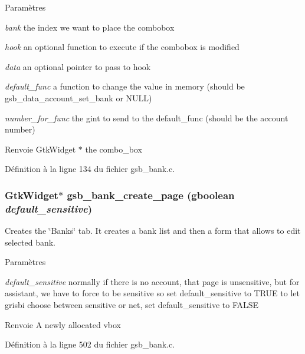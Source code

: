 \begin{DoxyParams}{Paramètres}
\item[{\em bank}]the index we want to place the combobox \item[{\em hook}]an optional function to execute if the combobox is modified \item[{\em data}]an optional pointer to pass to hook \item[{\em default\_\-func}]a function to change the value in memory (should be gsb\_\-data\_\-account\_\-set\_\-bank or NULL) \item[{\em number\_\-for\_\-func}]the gint to send to the default\_\-func (should be the account number)\end{DoxyParams}
\begin{DoxyReturn}{Renvoie}
GtkWidget $\ast$ the combo\_\-box 
\end{DoxyReturn}


Définition à la ligne 134 du fichier gsb\_\-bank.c.

\subsubsection[{gsb\_\-bank\_\-create\_\-page}]{\setlength{\rightskip}{0pt plus 5cm}GtkWidget$\ast$ gsb\_\-bank\_\-create\_\-page (gboolean {\em default\_\-sensitive})}\label{gsb__bank_8h_aef019dce3bfc8b3570e7bb6f8d356da1}
Creates the \char`\"{}Banks\char`\"{} tab. It creates a bank list and then a form that allows to edit selected bank.


\begin{DoxyParams}{Paramètres}
\item[{\em default\_\-sensitive}]normally if there is no account, that page is unsensitive, but for assistant, we have to force to be sensitive so set default\_\-sensitive to TRUE to let grisbi choose between sensitive or net, set default\_\-sensitive to FALSE \end{DoxyParams}
\begin{DoxyReturn}{Renvoie}
A newly allocated vbox 
\end{DoxyReturn}


Définition à la ligne 502 du fichier gsb\_\-bank.c.

